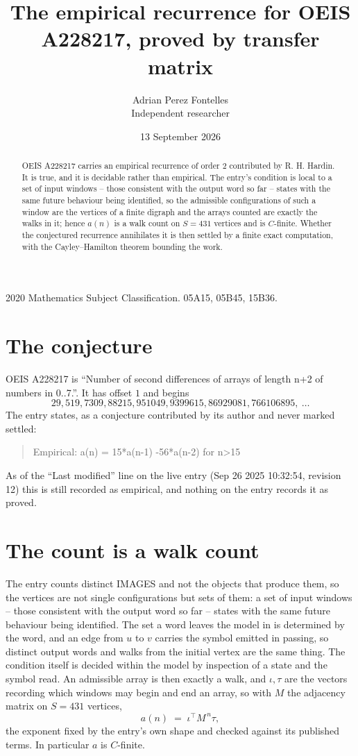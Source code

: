 \documentclass[11pt,a4paper]{article}
\title{The empirical recurrence for OEIS A228217, proved by transfer matrix}
\author{Adrian Perez Fontelles\\ \small Independent researcher}
\date{13 September 2026}
\theoremstyle{plain}
\theoremstyle{definition}
\begin{document}
\maketitle

\begin{abstract}
OEIS A228217 carries an empirical recurrence of order $2$ contributed by R. H. Hardin. It is
true, and it is decidable rather than empirical. The entry's condition is local to a set of input windows -- those consistent with the output word so far -- states with the same future behaviour being identified, so
the admissible configurations of such a window are the vertices of a finite digraph and the
arrays counted are exactly the walks in it; hence $a(n)$ is a walk count on $S=431$ vertices
and is $C$-finite. Whether the conjectured recurrence annihilates it is then settled by a
finite exact computation, with the Cayley--Hamilton theorem bounding the work.
\end{abstract}

\noindent\small 2020 Mathematics Subject Classification. 05A15, 05B45, 15B36.\normalsize

\section{The conjecture}

OEIS A228217 is ``Number of second differences of arrays of length n+2 of numbers in 0..7.''. It has offset $1$ and begins
\[
29, 519, 7309, 88215, 951049, 9399615, 86929081, 766106895,\ \dots
\]
The entry states, as a conjecture contributed by its author and never marked settled:
\begin{quote}
Empirical: a(n) = 15*a(n-1) -56*a(n-2) for n>15
\end{quote}
As of the ``Last modified'' line on the live entry (Sep 26 2025 10:32:54, revision 12) this is still
recorded as empirical, and nothing on the entry records it as proved.

\section{The count is a walk count}

The entry counts distinct IMAGES and not the objects that produce them, so the vertices are not single configurations but sets of them: a set of input windows -- those consistent with the output word so far -- states with the same future behaviour being identified. The set a word leaves the model in is determined by the word, and an edge from $u$ to $v$ carries the symbol emitted in passing, so distinct output words and walks from the initial vertex are the same thing. The condition itself is decided within the model by inspection of a state and the symbol read.
An admissible array is then exactly a walk, and $\iota,\tau$ are the vectors recording which windows may begin and end an array, so with $M$ the adjacency matrix on $S=431$ vertices,
\[
a(n)\;=\;\iota^{\!\top}M^{\,n}\tau ,
\]
the exponent fixed by the entry's own shape and checked against its published terms. In
particular $a$ is $C$-finite.
\end{document}
